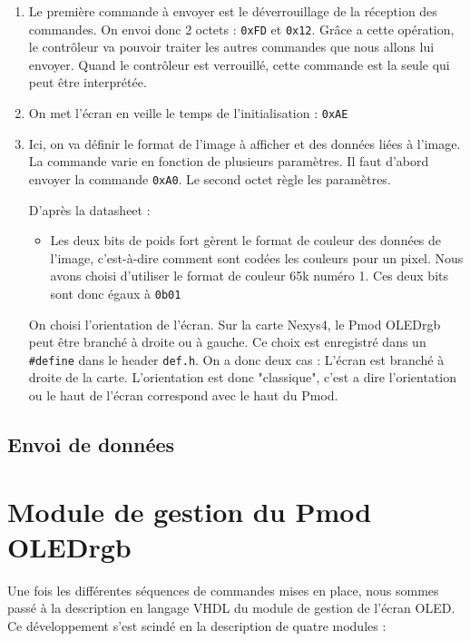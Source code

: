 \documentclass[11pt]{article}
\begin{document}
\begin{enumerate}
    \item Le première commande à envoyer est le déverrouillage de la réception des commandes. On envoi donc 2 octets : \texttt{0xFD} et \texttt{0x12}. Grâce a cette opération, le contrôleur va pouvoir traiter les autres commandes que nous allons lui envoyer. Quand le contrôleur est verrouillé, cette commande est la seule qui peut être interprétée. 

    \item On met l'écran en veille le temps de l'initialisation : \texttt{0xAE}

    \item Ici, on va définir le format de l'image à afficher et des données liées à l'image. La commande varie en fonction de plusieurs paramètres. Il faut d'abord envoyer la commande \texttt{0xA0}. Le second octet règle les paramètres. 

    D'après la datasheet : 
    \begin{itemize}
        \item Les deux bits de poids fort gèrent le format de couleur des données de l'image, c'est-à-dire comment sont codées les couleurs pour un pixel. Nous avons choisi d'utiliser le format de couleur 65k numéro 1. Ces deux bits sont donc égaux à \texttt{0b01}
    \end{itemize}

    On choisi l'orientation de l'écran. Sur la carte Nexys4, le Pmod OLEDrgb peut être branché à droite ou à gauche. Ce choix est enregistré dans un \texttt{\#define} dans le header \texttt{def.h}. On a donc deux cas : 
        \subitem L'écran est branché à droite de la carte. L'orientation est donc "classique", c'est a dire l'orientation ou le haut de l'écran correspond avec le haut du Pmod. 


\end{enumerate}


\subsection{Envoi de données}

\newpage

\section{Module de gestion du Pmod OLEDrgb}

Une fois les différentes séquences de commandes mises en place, nous sommes passé à la description en langage VHDL du module de gestion de l'écran OLED. Ce développement s'est scindé en la description de quatre modules :
\end{document}
